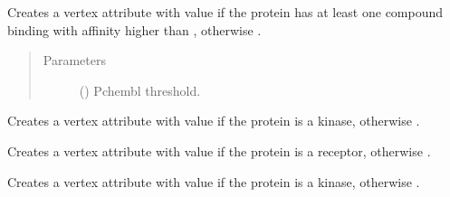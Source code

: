 \documentclass[letterpaper,10pt,english]{sphinxmanual}
\begin{document}
\begin{fulllineitems}
\begin{fulllineitems}
\label{\detokenize{main:pypath.main.PyPath.set_drugtargets}}
Creates a vertex attribute  with value  if
the protein has at least one compound binding with
affinity higher than , otherwise .
\begin{quote}\begin{description}
\item[{Parameters}] \leavevmode
{} () \textendash{} Pchembl threshold.

\end{description}\end{quote}

\end{fulllineitems}


\begin{fulllineitems}
\label{\detokenize{main:pypath.main.PyPath.set_kinases}}
Creates a vertex attribute  with value  if
the protein is a kinase, otherwise .

\end{fulllineitems}


\begin{fulllineitems}
\label{\detokenize{main:pypath.main.PyPath.set_receptors}}
Creates a vertex attribute  with value  if
the protein is a receptor, otherwise .

\end{fulllineitems}


\begin{fulllineitems}
\label{\detokenize{main:pypath.main.PyPath.set_signaling_proteins}}
Creates a vertex attribute  with value  if
the protein is a kinase, otherwise .


\end{fulllineitems}
\end{fulllineitems}
\end{document}
